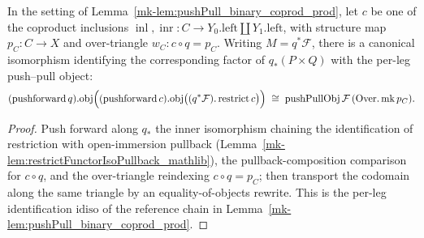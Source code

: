 \begin{lemma}\label{mk-lem:pushPullCoprodLegIso}
  \leanok

  In the setting of Lemma~\ref{mk-lem:pushPull_binary_coprod_prod}, let \(c\) be one of the coproduct
  inclusions \(\operatorname{inl}, \operatorname{inr} : C \to Y_0.\mathrm{left} \amalg Y_1.\mathrm{left}\),
  with structure map \(p_C : C \to X\) and over-triangle \(w_C : c \circ q = p_C\). Writing \(M =
  q^*\mathcal{F}\), there is a canonical isomorphism identifying the corresponding factor of \(q_*(P
  \times Q)\) with the per-leg push--pull object:
  \[
    (\operatorname{pushforward} q).\mathrm{obj}\Bigl((\operatorname{pushforward} c).\mathrm{obj}
      \bigl((q^*\mathcal{F}).\operatorname{restrict} c\bigr)\Bigr)
      \;\cong\;
    \operatorname{pushPullObj}\mathcal{F}\,(\operatorname{Over.mk} p_C).
  \]
\end{lemma}
\begin{proof}
  Push forward along \(q_*\) the inner isomorphism chaining the identification of restriction with
  open-immersion pullback (Lemma~\ref{mk-lem:restrictFunctorIsoPullback_mathlib}), the
  pullback-composition comparison for \(c \circ q\), and the over-triangle reindexing \(c \circ q = p_C\);
  then transport the codomain along the same triangle by an equality-of-objects rewrite. This is the
  per-leg identification \(\mathrm{idiso}\) of the reference chain in
  Lemma~\ref{mk-lem:pushPull_binary_coprod_prod}.
\end{proof}

